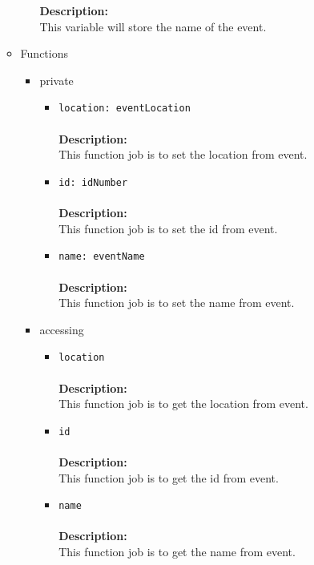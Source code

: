 \begin{itemize}
\begin{itemize}
\begin{itemize}
     \textbf{Description:}\\
     This variable will store the name of the event.
\end{itemize}


\item Functions
\label{sec-1-4-2-13-2}%
\begin{itemize}

\item private
\label{sec-1-4-2-13-2-1}%
\begin{itemize}
\item \verb~location: eventLocation~\\\\
\textbf{Description:}\\
      This function job is to set the location from event.\\
\item \verb~id: idNumber~\\\\
\textbf{Description:}\\
      This function job is to set the id from event.\\
\item \verb~name: eventName~\\\\
\textbf{Description:}\\
      This function job is to set the name from event.
\end{itemize}


\item accessing
\label{sec-1-4-2-13-2-2}%
\begin{itemize}
\item \verb~location~\\\\
\textbf{Description:}\\
      This function job is to get the location from event.\\
\item \verb~id~\\\\
\textbf{Description:}\\
      This function job is to get the id from event.\\
\item \verb~name~\\\\
\textbf{Description:}\\
      This function job is to get the name from event.
\end{itemize}


\end{itemize}
\end{itemize}
\end{itemize}
